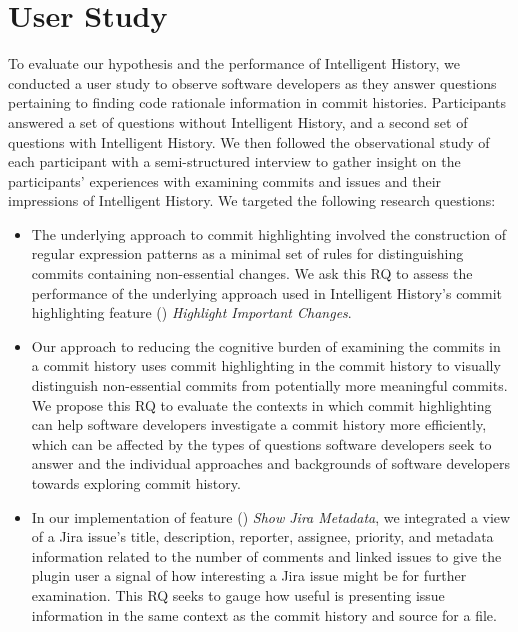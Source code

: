 \chapter{User Study}
\label{ch:Evaluation}

To evaluate our hypothesis and the performance of Intelligent History, 
we conducted a user study to observe software developers as they answer questions pertaining
to finding code rationale information in commit histories.
Participants answered a set of questions without Intelligent History,
and a second set of questions with Intelligent History.
We then followed the observational study of each participant with a semi-structured interview
to gather insight on the participants' experiences with examining commits and issues
and their impressions of Intelligent History.
We targeted the following research questions:

\begin{itemize}[leftmargin=*]
    \item[]  
    The underlying approach to commit highlighting involved the construction of regular expression patterns 
    as a minimal set of rules for distinguishing commits containing non-essential changes.
    We ask this RQ to assess the performance of the underlying approach 
    used in Intelligent History's commit highlighting feature () \textit{Highlight Important Changes}.

    \item[] 
    Our approach to reducing the cognitive burden of examining the commits in a commit history uses commit highlighting in
    the commit history to visually distinguish non-essential commits from potentially more meaningful commits. 
    We propose this RQ to evaluate the contexts in which commit highlighting can help software developers
    investigate a commit history more efficiently, which can be affected by the types of 
    questions software developers seek to answer and the individual approaches and backgrounds of software developers towards
    exploring commit history.

    \item[] 
    In our implementation of feature () \textit{Show Jira Metadata}, we integrated a view of a Jira issue's title, description, reporter, assignee, priority,
    and metadata information related to the number of comments and linked issues to give the plugin user a signal 
    of how interesting a Jira issue might be for further examination.
    This RQ seeks to gauge how useful is presenting issue information in the same context as the commit history and source for a file.
\end{itemize}


